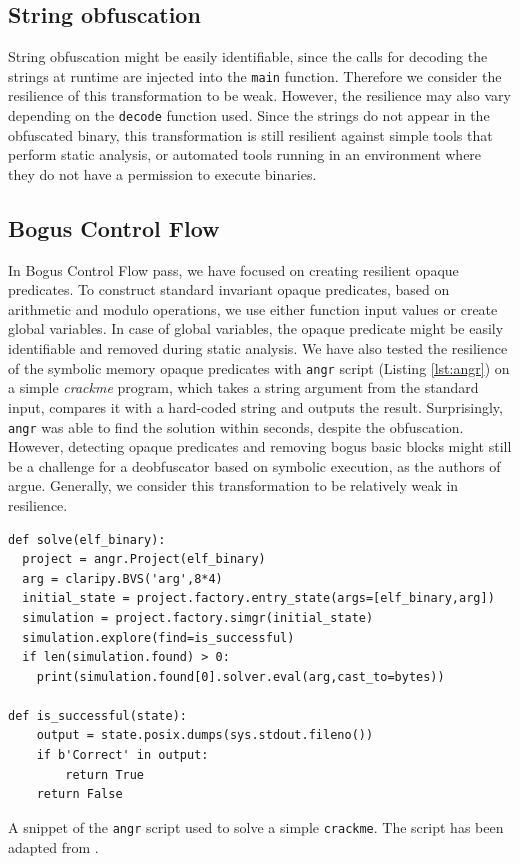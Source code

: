 \documentclass[
  digital, %
  notable,   %
  twoside, %
  nolof,     %
  nolot,     %
]{fithesis3}
\theoremstyle{definition}
\begin{document}
\subsection{String obfuscation}
String obfuscation might be easily identifiable, since the calls for decoding the strings at runtime are injected into the \texttt{main} function. Therefore we consider the resilience of this transformation to be weak. However, the resilience may also vary depending on the \texttt{decode} function used. Since the strings do not appear in the obfuscated binary, this transformation is still resilient against simple tools that perform static analysis, or automated tools running in an environment where they do not have a permission to execute binaries. 

\subsection{Bogus Control Flow}

In Bogus Control Flow pass, we have focused on creating resilient opaque predicates. To construct standard invariant opaque predicates, based on arithmetic and modulo operations, we use either function input values or create global variables. In case of global variables, the opaque predicate might be easily identifiable and removed during static analysis. We have also tested the resilience of the symbolic memory opaque predicates with \texttt{angr} script (Listing \ref{lst:angr}) on a simple \textit{crackme} program, which takes a string argument from the standard input, compares it with a hard-coded string and outputs the result. Surprisingly, \texttt{angr} was able to find the solution within seconds, despite the obfuscation. However, detecting opaque predicates and removing bogus basic blocks might still be a challenge for a deobfuscator based on symbolic execution, as the authors of \cite{bi_opaque} argue. Generally, we consider this transformation to be relatively weak in resilience. 

\begin{listing}[!ht]
\begin{verbatim}
def solve(elf_binary):
  project = angr.Project(elf_binary) 
  arg = claripy.BVS('arg',8*4)
  initial_state = project.factory.entry_state(args=[elf_binary,arg]) 
  simulation = project.factory.simgr(initial_state) 
  simulation.explore(find=is_successful)
  if len(simulation.found) > 0:
    print(simulation.found[0].solver.eval(arg,cast_to=bytes))

def is_successful(state):
	output = state.posix.dumps(sys.stdout.fileno())
	if b'Correct' in output: 
		return True
	return False
\end{verbatim}
\label{lst:angr}
\caption{A snippet of the \texttt{angr} script used to solve a simple \texttt{crackme}. The script has been adapted from \cite{crackme_angr}.}
\end{listing}
\end{document}

